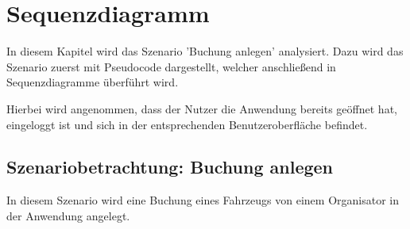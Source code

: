\chapter{Sequenzdiagramm}
In diesem Kapitel wird das Szenario 'Buchung anlegen' analysiert. Dazu wird das Szenario zuerst mit Pseudocode dargestellt, welcher anschließend in Sequenzdiagramme überführt wird.

Hierbei wird angenommen, dass der Nutzer die Anwendung bereits geöffnet hat, eingeloggt ist und sich in der entsprechenden Benutzeroberfläche befindet.

\section{Szenariobetrachtung: Buchung anlegen}

In diesem Szenario wird eine Buchung eines Fahrzeugs von einem Organisator in der Anwendung angelegt. 